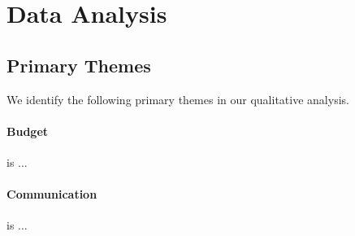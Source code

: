 
\section{Data Analysis}


\subsection{Primary Themes}
We identify the following primary themes in our qualitative analysis.

\paragraph{Budget} is ...

\paragraph{Communication} is ...

